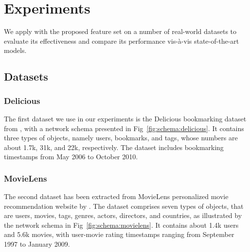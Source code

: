 \section{Experiments}\label{sec:results}

We apply \npglm with the proposed feature set on a number of real-world datasets to evaluate its effectiveness and compare its performance vis-\`a-vis state-of-the-art models. 

\subsection{Datasets}


\subsubsection{Delicious}
The first dataset we use in our experiments is the Delicious bookmarking dataset from \cite{Cantador:RecSys2011}, with a network schema presented in Fig~\ref{fig:schema:delicious}. It contains three types of objects, namely users, bookmarks, and tags, whose numbers are about 1.7k, 31k, and 22k, respectively. The dataset includes bookmarking timestamps from May 2006 to October 2010.

\subsubsection{MovieLens}
The second dataset has been extracted from MovieLens personalized movie recommendation website by \cite{harper2015}. The dataset comprises seven types of objects, that are users, movies, tags, genres, actors, directors, and countries, as illustrated by the network schema in Fig~\ref{fig:schema:movielens}. It contains about 1.4k users and 5.6k movies, with user-movie rating timestamps ranging from September 1997 to January 2009.

